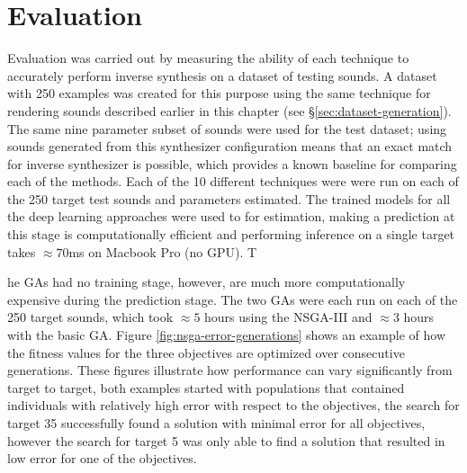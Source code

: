 


\section{Evaluation}
\label{sec:inverse-synth-eval}

Evaluation was carried out by measuring the ability of each technique to accurately perform inverse synthesis on a dataset of testing sounds. A dataset with 250 examples was created for this purpose using the same technique for rendering sounds described earlier in this chapter (see \S\ref{sec:dataset-generation}). The same nine parameter subset of sounds were used for the test dataset; using sounds generated from this synthesizer configuration means that an exact match for inverse synthesizer is possible, which provides a known baseline for comparing each of the methods. Each of the 10 different techniques were were run on each of the 250 target test sounds and parameters estimated. The trained models for all the deep learning approaches were used to for estimation, making a prediction at this stage is computationally efficient and performing inference on a single target takes $\approx 70$ms on Macbook Pro (no GPU). T

he GAs had no training stage, however, are much more computationally expensive during the prediction stage. The two GAs were each run on each of the 250 target sounds, which took $\approx 5$ hours using the NSGA-III and $\approx 3$ hours with the basic GA. Figure \ref{fig:nsga-error-generations} shows an example of how the fitness values for the three objectives are optimized over consecutive generations. These figures illustrate how performance can vary significantly from target to target, both examples started with populations that contained individuals with relatively high error with respect to the objectives, the search for target 35 successfully found a solution with minimal error for all objectives, however the search for target 5 was only able to find a solution that resulted in low error for one of the objectives.


